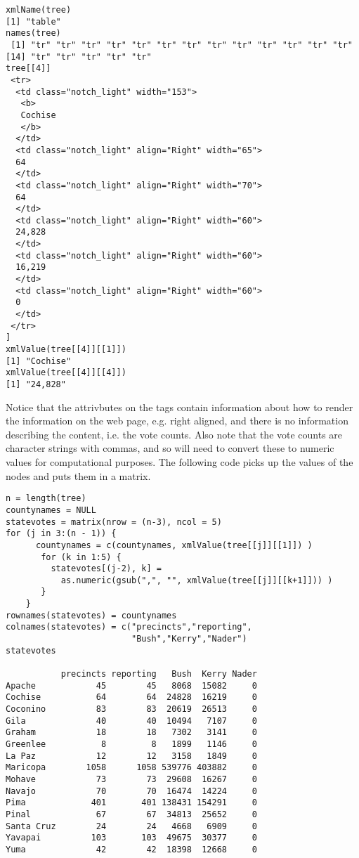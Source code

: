 \begin{verbatim}
xmlName(tree)
[1] "table"
names(tree)
 [1] "tr" "tr" "tr" "tr" "tr" "tr" "tr" "tr" "tr" "tr" "tr" "tr" "tr" 
[14] "tr" "tr" "tr" "tr" "tr"
tree[[4]]
 <tr>
  <td class="notch_light" width="153">
   <b>
   Cochise
   </b>
  </td>
  <td class="notch_light" align="Right" width="65">
  64
  </td>
  <td class="notch_light" align="Right" width="70">
  64
  </td>
  <td class="notch_light" align="Right" width="60">
  24,828
  </td>
  <td class="notch_light" align="Right" width="60">
  16,219
  </td>
  <td class="notch_light" align="Right" width="60">
  0
  </td>
 </tr>
]
xmlValue(tree[[4]][[1]])
[1] "Cochise"
xmlValue(tree[[4]][[4]])
[1] "24,828"
\end{verbatim}
Notice that the attrivbutes on the  tags
contain information about how to render the information
on the web page, e.g. right aligned, and there is no 
information describing the content, i.e. the vote counts.
Also note that the vote counts are character strings with 
commas, and so will need to convert these to numeric values 
for computational purposes.
The following code picks up the values of the  nodes
and puts them in a matrix. 
\begin{verbatim}
n = length(tree)
countynames = NULL
statevotes = matrix(nrow = (n-3), ncol = 5)
for (j in 3:(n - 1)) {
      countynames = c(countynames, xmlValue(tree[[j]][[1]]) ) 
       for (k in 1:5) {
         statevotes[(j-2), k] =     
           as.numeric(gsub(",", "", xmlValue(tree[[j]][[k+1]])) )
       }
    }
rownames(statevotes) = countynames
colnames(statevotes) = c("precincts","reporting",
                         "Bush","Kerry","Nader")
statevotes

           precincts reporting   Bush  Kerry Nader
Apache            45        45   8068  15082     0
Cochise           64        64  24828  16219     0
Coconino          83        83  20619  26513     0
Gila              40        40  10494   7107     0
Graham            18        18   7302   3141     0
Greenlee           8         8   1899   1146     0
La Paz            12        12   3158   1849     0
Maricopa        1058      1058 539776 403882     0
Mohave            73        73  29608  16267     0
Navajo            70        70  16474  14224     0
Pima             401       401 138431 154291     0
Pinal             67        67  34813  25652     0
Santa Cruz        24        24   4668   6909     0
Yavapai          103       103  49675  30377     0
Yuma              42        42  18398  12668     0
\end{verbatim}

